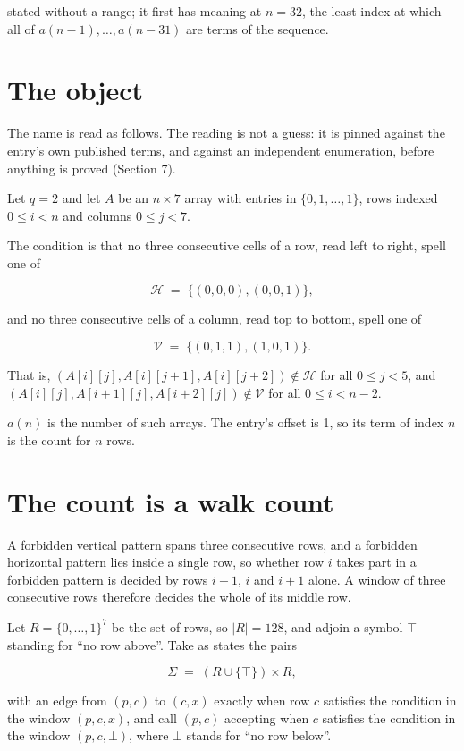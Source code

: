 \documentclass[11pt]{article}
\theoremstyle{definition}
\begin{document}
stated without a range; it first has meaning at $n = 32$, the least index at which all of $a(n-1),\dots,a(n-31)$ are terms of the sequence.

\section{The object}

The name is read as follows. The reading is not a guess: it is pinned against the entry's own published terms, and against an independent enumeration, before anything is proved (Section 7).

Let $q = 2$ and let $A$ be an $n \times 7$ array with entries in $\{0,1,\dots,1\}$, rows indexed $0 \le i < n$ and columns $0 \le j < 7$.

The condition is that no three consecutive cells of a row, read left to right, spell one of

\[\mathcal{H} \;=\; \{(0,0,0), (0,0,1)\},\]

and no three consecutive cells of a column, read top to bottom, spell one of

\[\mathcal{V} \;=\; \{(0,1,1), (1,0,1)\}.\]

That is, $(A[i][j],A[i][j{+}1],A[i][j{+}2]) \notin \mathcal{H}$ for all $0 \le j < 5$, and $(A[i][j],A[i{+}1][j],A[i{+}2][j]) \notin \mathcal{V}$ for all $0 \le i < n-2$.

$a(n)$ is the number of such arrays. The entry's offset is 1, so its term of index $n$ is the count for $n$ rows.

\section{The count is a walk count}

A forbidden vertical pattern spans three consecutive rows, and a forbidden horizontal pattern lies inside a single row, so whether row $i$ takes part in a forbidden pattern is decided by rows $i-1$, $i$ and $i+1$ alone. A window of three consecutive rows therefore decides the whole of its middle row.

Let $R = \{0,\dots,1\}^{7}$ be the set of rows, so $|R| = 128$, and adjoin a symbol $\top$ standing for ``no row above''. Take as states the pairs

\[\Sigma \;=\; (R \cup \{\top\}) \times R,\]

with an edge from $(p,c)$ to $(c,x)$ exactly when row $c$ satisfies the condition in the window $(p,c,x)$, and call $(p,c)$ accepting when $c$ satisfies the condition in the window $(p,c,\bot)$, where $\bot$ stands for ``no row below''.
\end{document}
